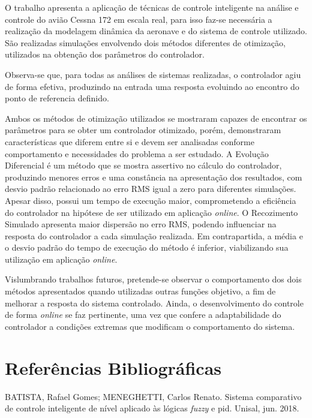\documentclass[10pt,a4paper]{article}
\numberwithin{equation}{section}
\begin{document}
\par O trabalho apresenta a aplicação de técnicas de controle inteligente na análise e controle do avião Cessna 172 em escala real, para isso faz-se necessária a realização da modelagem dinâmica da aeronave e do sistema de controle utilizado. São realizadas simulações envolvendo dois métodos diferentes de otimização, utilizados na obtenção dos parâmetros do controlador.
\par Observa-se que, para todas as análises de sistemas realizadas, o controlador agiu de forma efetiva, produzindo na entrada uma resposta evoluindo ao encontro do ponto de referencia definido. 
\par Ambos os métodos de otimização utilizados se mostraram capazes de encontrar os parâmetros para se obter um controlador otimizado, porém, demonstraram características que diferem entre si e devem ser analisadas conforme comportamento e necessidades do problema a ser estudado. A Evolução Diferencial é um método que se mostra assertivo no cálculo do controlador, produzindo menores erros e uma constância na apresentação dos resultados, com desvio padrão relacionado ao erro RMS igual a zero para diferentes simulações. Apesar disso, possui um tempo de execução maior, comprometendo a eficiência do controlador na hipótese de ser utilizado em aplicação \textit{online}.  O Recozimento Simulado apresenta maior dispersão no erro RMS, podendo influenciar na resposta do controlador a cada simulação realizada. Em contrapartida, a média e o desvio padrão do tempo de execução do método é inferior, viabilizando sua utilização em aplicação \textit{online}.
\par Vislumbrando trabalhos futuros, pretende-se observar o comportamento dos dois métodos apresentados quando utilizadas outras funções objetivo, a fim de melhorar a resposta do sistema controlado. Ainda, o desenvolvimento do controle de forma \textit{online} se faz pertinente, uma vez que confere a adaptabilidade do controlador a condições extremas que modificam o comportamento do sistema.  

\newpage

\section{Referências Bibliográficas}

\par BATISTA, Rafael Gomes; MENEGHETTI, Carlos Renato. Sistema comparativo de controle inteligente de nível aplicado às lógicas \textit{fuzzy} e pid. Unisal,  jun. 2018.\\
\end{document}
